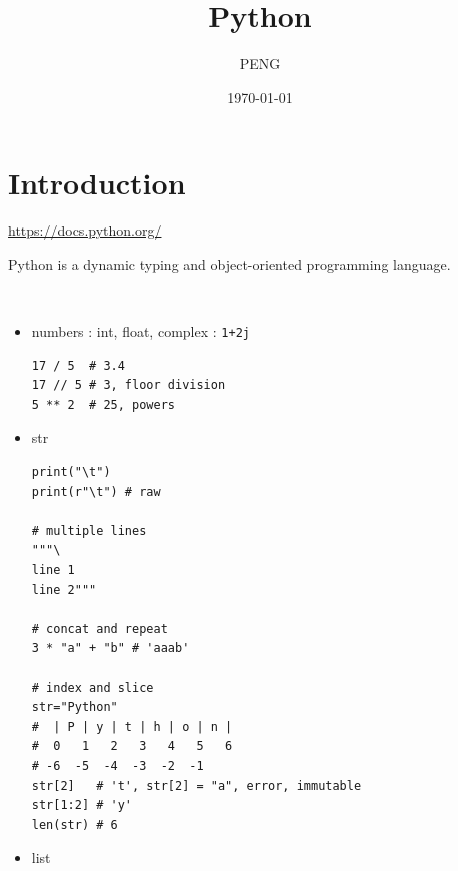 \documentclass{article}
\title{Python}
\author{PENG}
\date{\today}
\begin{document}
\maketitle
\tableofcontents
\section{Introduction}
\url{https://docs.python.org/}

\begin{definition}[python]
    Python is a dynamic typing and object-oriented programming language.
\end{definition}

\begin{definition}[types]~
    \begin{itemize}
        \item numbers : int, float, complex : \verb|1+2j|
              \begin{verbatim}
17 / 5  # 3.4
17 // 5 # 3, floor division
5 ** 2  # 25, powers
\end{verbatim}
        \item str
              \begin{verbatim}
print("\t")
print(r"\t") # raw

# multiple lines
"""\
line 1
line 2"""

# concat and repeat
3 * "a" + "b" # 'aaab'

# index and slice
str="Python"
#  | P | y | t | h | o | n |
#  0   1   2   3   4   5   6
# -6  -5  -4  -3  -2  -1
str[2]   # 't', str[2] = "a", error, immutable
str[1:2] # 'y'
len(str) # 6
\end{verbatim}
        \item list
    \end{itemize}
\end{definition}

\printbibliography
\end{document}
